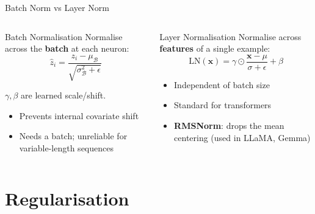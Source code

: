 \documentclass[aspectratio=169, professionalfonts]{beamer}
\begin{document}
\begin{frame}{Batch Norm vs Layer Norm}

\begin{columns}[t]
\begin{block}{Batch Normalisation}
Normalise across the \textbf{batch} at each neuron:
$$\hat{z}_i
  = \frac{z_i - \mu_\mathcal{B}}
         {\sqrt{\sigma_\mathcal{B}^2+\epsilon}}$$

$\gamma,\beta$ are learned scale/shift.

\smallskip

\begin{itemize}
  \item Prevents internal covariate shift
  \item Needs a batch; unreliable for variable-length sequences
\end{itemize}
\end{block}

\begin{block}{Layer Normalisation}
Normalise across \textbf{features} of a single example:
$$\text{LN}(\mathbf{x})
  = \gamma\odot\frac{\mathbf{x}-\mu}{\sigma+\epsilon}+\beta$$

\smallskip

\begin{itemize}
  \item Independent of batch size
  \item Standard for transformers
  \item \textbf{RMSNorm}: drops the mean
        centering (used in LLaMA, Gemma)
\end{itemize}
\end{block}
\end{columns}

\end{frame}

\section{Regularisation}
\end{document}
